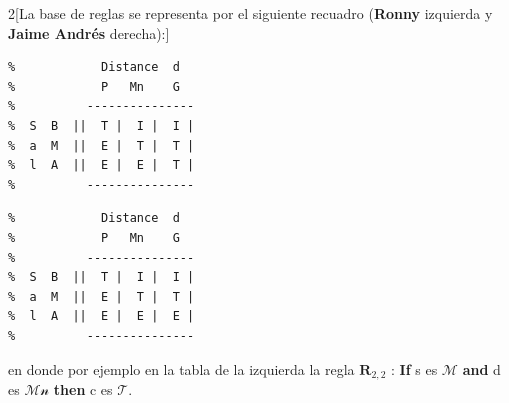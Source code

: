 \documentclass[10pt,onecolumn,twoside,letterpaper]{article}
\begin{document}
\begin{multicols}{2}[La base de reglas se representa por el siguiente recuadro (\textbf{Ronny} izquierda y \textbf{Jaime Andr\'es} derecha):]
\begin{lstlisting}
%            Distance  d
%            P   Mn    G
%          ---------------
%  S  B  ||  T |  I |  I |
%  a  M  ||  E |  T |  T |
%  l  A  ||  E |  E |  T |
%          ---------------
\end{lstlisting}
\begin{lstlisting}
%            Distance  d
%            P   Mn    G
%          ---------------
%  S  B  ||  T |  I |  I |
%  a  M  ||  E |  T |  T |
%  l  A  ||  E |  E |  E |
%          ---------------
\end{lstlisting}
\end{multicols}
en donde por ejemplo en la tabla de la izquierda la regla $\mathbf{R}_{2,2}$ : \textbf{If} s es $\mathcal{M}$ \textbf{and} d es $\mathcal{Mn}$ \textbf{then} c es $\mathcal{T}$.\\
\end{document}
